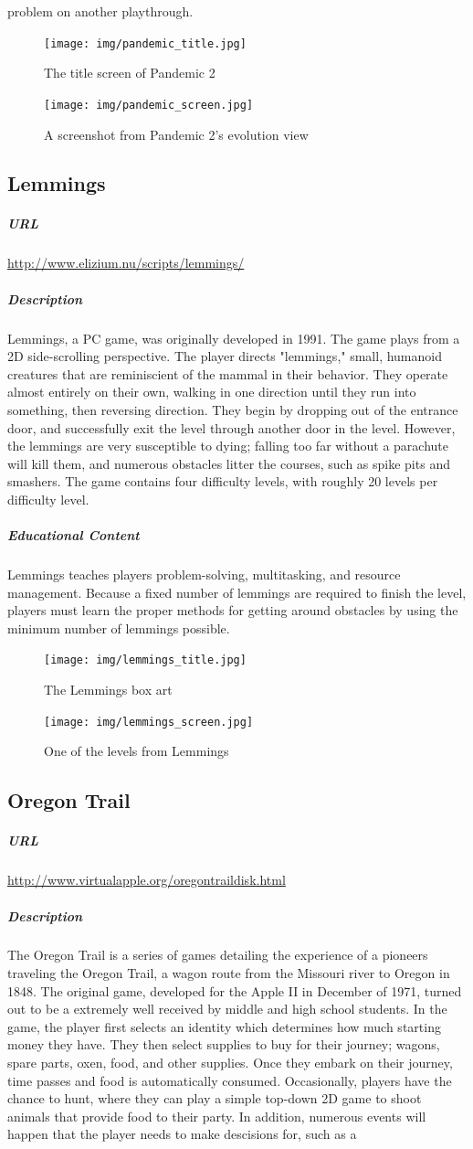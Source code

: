 problem on another playthrough.\begin{figure}[h!]\centering \texttt{[image: img/pandemic\_title.jpg]}\caption{The title screen of Pandemic 2}\end{figure}\begin{figure}[h!]\centering \texttt{[image: img/pandemic\_screen.jpg]}\caption{A screenshot from Pandemic 2's evolution view}\end{figure}\newpage\subsection{Lemmings}\subparagraph{URL}\url{http://www.elizium.nu/scripts/lemmings/}\subparagraph{Description}Lemmings, a PC game, was originally developed in 1991. The game plays from a 2D side-scrolling perspective. The player directs "lemmings," small, humanoid creatures that are reminiscient of the mammal in their behavior. They operate almost entirely on their own, walking in one direction until they run into something, then reversing direction. They begin by dropping out of the entrance door, and successfully exit the level through another door in the level. However, the lemmings are very susceptible to dying; falling too far without a parachute will kill them, and numerous obstacles litter the courses, such as spike pits and smashers. The game contains four difficulty levels, with roughly 20 levels per difficulty level.\subparagraph{Educational Content}Lemmings teaches players problem-solving, multitasking, and resource management. Because a fixed number of lemmings are required to finish the level, players must learn the proper methods for getting around obstacles by using the minimum number of lemmings possible.\begin{figure}[h!]\centering \texttt{[image: img/lemmings\_title.jpg]}\caption{The Lemmings box art}\end{figure}\begin{figure}[h!]\centering \texttt{[image: img/lemmings\_screen.jpg]}\caption{One of the levels from Lemmings}\end{figure}\newpage\subsection{Oregon Trail}\subparagraph{URL}\url{http://www.virtualapple.org/oregontraildisk.html}\subparagraph{Description}The Oregon Trail is a series of games detailing the experience of a pioneers traveling the Oregon Trail, a wagon route from the Missouri river to Oregon in 1848. The original game, developed for the Apple II in December of 1971, turned out to be a extremely well received by middle and high school students. In the game, the player first selects an identity which determines how much starting money they have. They then select supplies to buy for their journey; wagons, spare parts, oxen, food, and other supplies. Once they embark on their journey, time passes and food is automatically consumed. Occasionally, players have the chance to hunt, where they can play a simple top-down 2D game to shoot animals that provide food to their party. In addition, numerous events will happen that the player needs to make descisions for, such as a 